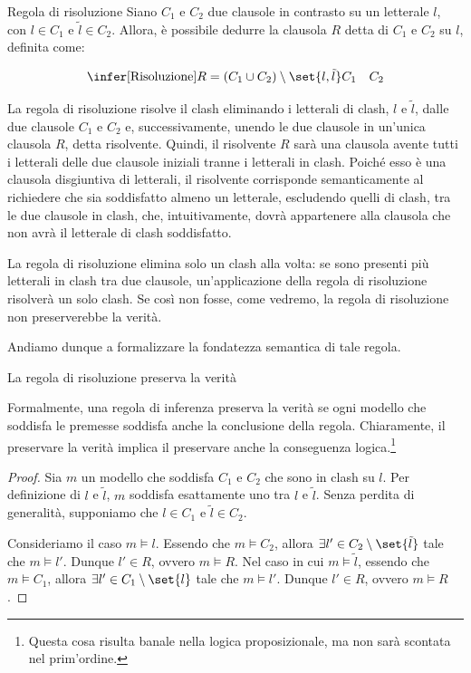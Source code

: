 \begin{definition}{Regola di risoluzione}
  Siano \(C_1\) e \(C_2\) due clausole in contrasto su un letterale \(l\), con \(l \in C_1\) e \(\tilde{l} \in C_2\). Allora, è possibile dedurre la clausola \(R\) detta  di \(C_1\) e \(C_2\) su \(l\), definita come:

  \[\infer[\text{Risoluzione}]{R = (C_1 \cup C_2)\setminus\set{l, \tilde{l}}}{C_1 \quad C_2}\]

\end{definition}

La regola di risoluzione risolve il clash eliminando i letterali di clash, \(l\) e \(\tilde{l}\), dalle due clausole \(C_1\) e \(C_2\) e, successivamente, unendo le due clausole in un'unica clausola \(R\), detta risolvente.
Quindi, il risolvente \(R\) sarà una clausola avente tutti i letterali delle due clausole iniziali tranne i letterali in clash. 
Poiché esso è una clausola disgiuntiva di letterali, il risolvente corrisponde semanticamente al richiedere che sia soddisfatto almeno un letterale, escludendo quelli di clash, tra le due clausole in clash, che, intuitivamente, dovrà appartenere alla clausola che non avrà il letterale di clash soddisfatto.

\begin{warning}{}
  La regola di risoluzione elimina solo un clash alla volta: se sono presenti più letterali in clash tra due clausole, un'applicazione della regola di risoluzione risolverà un solo clash. 
  Se così non fosse, come vedremo, la regola di risoluzione non preserverebbe la verità.
\end{warning}

Andiamo dunque a formalizzare la fondatezza semantica di tale regola.

\begin{proposition}{}
  La regola di risoluzione preserva la verità
\end{proposition}

Formalmente, una regola di inferenza preserva la verità se ogni modello che soddisfa le premesse soddisfa anche la conclusione della regola.
Chiaramente, il preservare la verità implica il preservare anche la conseguenza logica.\footnote{Questa cosa risulta banale nella logica proposizionale, ma non sarà scontata nel prim'ordine.}

\begin{proof}
  Sia \(m\) un modello che soddisfa \(C_1\) e \(C_2\) che sono in clash su \(l\).
  Per definizione di \(l\) e \(\tilde{l}\), \(m\) soddisfa esattamente uno tra \(l\) e \(\tilde{l}\). Senza perdita di generalità, supponiamo che \(l\in C_1\) e \(\tilde{l}\in C_2\).

  Consideriamo il caso \(m\models l\). Essendo che \(m\models C_2\), allora \(\exists l' \in C_2\setminus\set{\tilde{l}}\) tale che \(m\models l'\). Dunque \(l' \in R\), ovvero \(m\models R\).
  Nel caso in cui \(m \models \tilde{l}\), essendo che \(m\models C_1\), allora \(\exists l' \in C_1\setminus\set{l}\) tale che \(m\models l'\). Dunque \(l' \in R\), ovvero \(m\models R\).
\end{proof}

